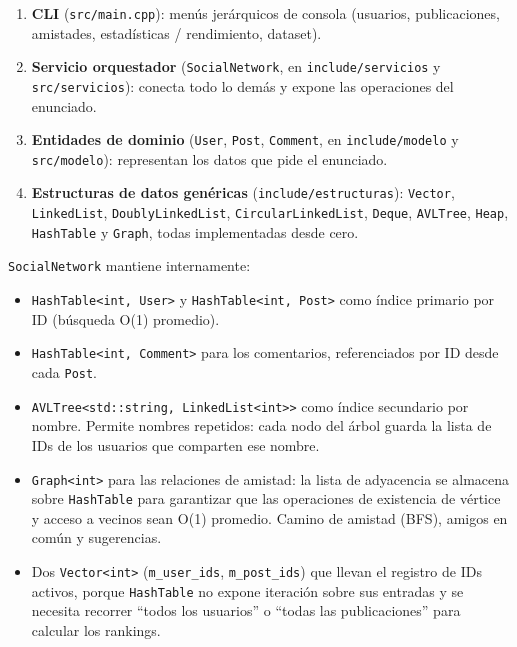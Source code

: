 \documentclass[11pt,a4paper]{article}
\begin{document}
\begin{enumerate}[leftmargin=1.4em]
    \item \textbf{CLI} (\texttt{src/main.cpp}): menús jerárquicos de
    consola (usuarios, publicaciones, amistades, estadísticas /
    rendimiento, dataset).
    \item \textbf{Servicio orquestador} (\texttt{SocialNetwork}, en
    \texttt{include/servicios} y \texttt{src/servicios}): conecta todo lo
    demás y expone las operaciones del enunciado.
    \item \textbf{Entidades de dominio} (\texttt{User}, \texttt{Post},
    \texttt{Comment}, en \texttt{include/modelo} y \texttt{src/modelo}):
    representan los datos que pide el enunciado.
    \item \textbf{Estructuras de datos genéricas}
    (\texttt{include/estructuras}): \texttt{Vector}, \texttt{LinkedList},
    \texttt{DoublyLinkedList}, \texttt{CircularLinkedList},
    \texttt{Deque}, \texttt{AVLTree}, \texttt{Heap}, \texttt{HashTable} y
    \texttt{Graph}, todas implementadas desde cero.
\end{enumerate}

\texttt{SocialNetwork} mantiene internamente:

\begin{itemize}[leftmargin=1.4em]
    \item \texttt{HashTable<int, User>} y \texttt{HashTable<int, Post>}
    como índice primario por ID (búsqueda O(1) promedio).
    \item \texttt{HashTable<int, Comment>} para los comentarios,
    referenciados por ID desde cada \texttt{Post}.
    \item \texttt{AVLTree<std::string, LinkedList<int>>} como índice
    secundario por nombre. Permite nombres repetidos: cada nodo del árbol
    guarda la lista de IDs de los usuarios que comparten ese nombre.
    \item \texttt{Graph<int>} para las relaciones de amistad: la lista de
    adyacencia se almacena sobre \texttt{HashTable} para garantizar que
    las operaciones de existencia de vértice y acceso a vecinos sean O(1)
    promedio. Camino de amistad (BFS), amigos en común y sugerencias.
    \item Dos \texttt{Vector<int>} (\texttt{m\_user\_ids},
    \texttt{m\_post\_ids}) que llevan el registro de IDs activos, porque
    \texttt{HashTable} no expone iteración sobre sus entradas y se
    necesita recorrer ``todos los usuarios'' o ``todas las
    publicaciones'' para calcular los rankings.
\end{itemize}
\end{document}
